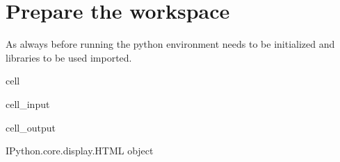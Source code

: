 \documentclass[letterpaper,10pt,english]{jupyterBook}
\begin{document}
\section{Prepare the workspace}
\label{\detokenize{content/06_ModelAnalytics/Attribution:prepare-the-workspace}}
\sphinxAtStartPar
As always before running  the python environment needs to be initialized and libraries to be used imported.

\begin{sphinxuseclass}{cell}\begin{sphinxVerbatimInput}

\begin{sphinxuseclass}{cell_input}
\begin{sphinxVerbatim}[commandchars=\\\{\}]
   

    


\end{sphinxVerbatim}

\end{sphinxuseclass}\end{sphinxVerbatimInput}
\begin{sphinxVerbatimOutput}

\begin{sphinxuseclass}{cell_output}
\begin{sphinxVerbatim}[commandchars=\\\{\}]
\PYGZlt{}IPython.core.display.HTML object\PYGZgt{}
\end{sphinxVerbatim}

\end{sphinxuseclass}\end{sphinxVerbatimOutput}

\end{sphinxuseclass}
\end{document}
